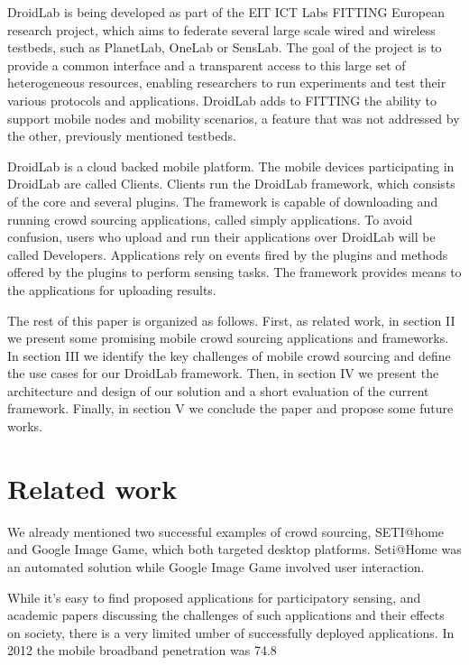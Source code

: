 \documentclass[conference,letterpaper]{IEEEtran}
\begin{document}
DroidLab is being developed as part of the EIT ICT Labs FITTING European research project, which aims to federate several large scale wired and wireless testbeds, such as PlanetLab, OneLab or SensLab. The goal of the project is to provide a common interface and a transparent access to this large set of heterogeneous resources, enabling researchers to run experiments and test their various protocols and applications. DroidLab adds to FITTING the ability to support mobile nodes and mobility scenarios, a feature that was not addressed by the other, previously mentioned testbeds.     

DroidLab is a cloud backed mobile platform. The mobile devices participating in DroidLab are called Clients. Clients run the DroidLab framework, which consists of the core and several plugins. The framework is capable of downloading and running crowd sourcing applications, called simply applications. To avoid confusion, users who upload and run their applications over DroidLab will be called Developers. Applications rely on events fired by the plugins and methods offered by the plugins to perform sensing tasks. The framework provides means to the applications for uploading results.

The rest of this paper is organized as follows. First, as related work, in section II we present some  promising mobile crowd sourcing applications and frameworks. In section III we  identify the key challenges of mobile crowd sourcing and define the use cases for our DroidLab framework. Then, in section IV we present the architecture and design of our solution and  a short evaluation of the current framework. Finally, in section V we conclude the paper and propose some future works.

\section{Related work}
\label{sec:related_work}
We already mentioned two successful examples of crowd sourcing, SETI@home and Google Image Game, which both targeted desktop platforms. Seti@Home was an automated solution while Google Image Game involved user interaction.

While it's easy to find proposed applications for participatory sensing, and academic papers discussing the challenges of such applications and their effects on society, there is a very limited umber of successfully deployed applications. In 2012 the mobile broadband penetration was  74.8%
\end{document}
